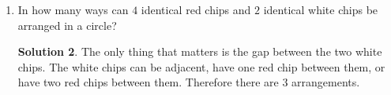 \documentclass{article}
\theoremstyle{definition}
\newtheorem*{solution}{Solution}
\begin{document}
\begin{multicols}{2}
\begin{enumerate}
\begin{solution}
                there are $6 \cdot 5 = 30$ ways to order the vowels. For the 
                consonants, we have two N's, two M's, one T, and one Z. There are 
                $6!$ ways to arrange six letters, and we divide by $2! \cdot 2!$ to 
                account for the two pairs of repeated letters. (See the notes for 
                more details on why we do this.) The number of ways to arrange the 
                consonants is then $\frac{6!}{2! \cdot 2!} = 180$. The total is then 
                $7 \cdot 30 \cdot 180 = 37800$.
            \end{solution}
        \item In how many ways can $4$ identical red chips and $2$ identical white chips be 
            arranged in a circle?
            \begin{solution}
                The only thing that matters is the gap between the two white chips. 
                The white chips can be adjacent, have one red chip between them, or 
                have two red chips between them. Therefore there are $3$ 
                arrangements.
            \end{solution}
    \end{enumerate}
\end{multicols}
\end{document}
